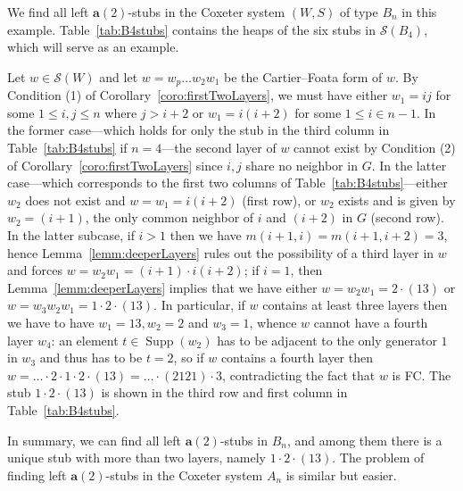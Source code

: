 \documentclass[ALCO,Unicode,published]{cedram}
\newcommand{\cals}{\mathcal{S}}
\newcommand{\la}{\mathbf{a}}
\newcommand{\sw}{\mathcal{S}(W)}
\DeclareMathOperator{\supp}{\mathrm{Supp}}
\begin{document}
\begin{example}
    \label{eg:layerAnalysis} 
    We find all left $\la(2)$-stubs in the Coxeter system $(W,S)$ of type $B_n$ in this example.
    Table~\ref{tab:B4stubs} contains the heaps of the six stubs in $\cals(B_4)$, which will serve as an example. 

    Let $w\in\sw$ and let $w=w_p\dots w_2w_1$ be the Cartier--Foata form of $w$.  By Condition (1)
    of Corollary~\ref{coro:firstTwoLayers}, we must have either $w_1=ij$ for some $1\le i,j\le n$ where
    $j>i+2$ or $w_1=i(i+2)$ for some $1\le i\in n-1$. In the former case---which holds for only the
    stub in the third column in Table~\ref{tab:B4stubs} if $n=4$---the second layer of $w$ cannot exist
    by Condition (2) of Corollary~\ref{coro:firstTwoLayers} since $i,j$ share no neighbor in $G$.  In the
    latter case---which corresponds to the first two columns of Table~\ref{tab:B4stubs}---either $w_2$
    does not exist and $w=w_1=i(i+2)$ (first row), or $w_2$ exists and is given by $w_2=(i+1)$, the
    only common neighbor of $i$ and $(i+2)$ in $G$ (second row). In the latter subcase, if $i>1$
    then we have $m(i+1,i)=m(i+1,i+2)=3$, hence Lemma~\ref{lemm:deeperLayers} rules out the possibility
    of a third layer in $w$ and forces $w=w_2w_1=(i+1)\cdot i(i+2)$; if $i=1$, then
    Lemma~\ref{lemm:deeperLayers} implies that we have either $w=w_{2}w_1=2\cdot (13)$ or
    $w=w_3w_2w_1=1\cdot 2\cdot (13)$. In particular, if $w$ contains at least three layers then we
    have to have $w_1=13, w_2=2$ and $w_3=1$, whence $w$ cannot have a fourth layer $w_4$: an
    element $t\in \supp(w_2)$ has to be adjacent to the only generator $1$ in $w_3$ and thus has to
    be $t=2$, so if $w$ contains a fourth layer then $w=\dots\cdot 2\cdot 1\cdot 2\cdot
    (13)=\dots\cdot (2121)\cdot 3$, contradicting the fact that $w$ is FC. The stub $1\cdot 2\cdot
    (13)$ is shown in the third row and first column in Table~\ref{tab:B4stubs}.

    In summary, we can find all left $\la(2)$-stubs in $B_n$, and among them there is a unique stub
    with more than two layers, namely $1\cdot 2\cdot (13)$. The problem of finding left
    $\la(2)$-stubs in the Coxeter system $A_n$ is similar but easier.
\end{example}
\end{document}
